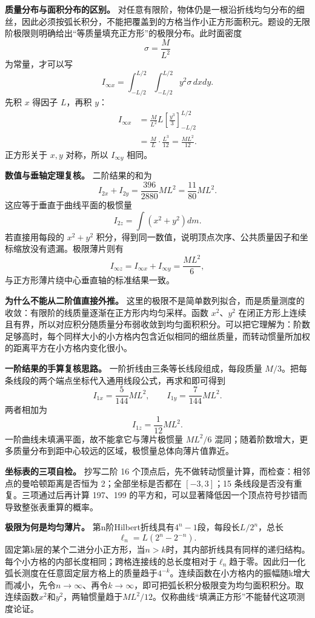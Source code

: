 \documentclass[12pt,a4paper,UTF8]{ctexart}
\begin{document}
\textbf{质量分布与面积分布的区别。}
对任意有限阶，物体仍是一根沿折线均匀分布的细丝，因此必须按弧长积分，不能把覆盖到的方格当作小正方形面积元。题设的无限阶极限则明确给出``等质量填充正方形''的极限分布。此时面密度
\[
\sigma=\frac{M}{L^2}
\] 为常量，才可以写 \[
I_{\infty x}
=\int_{-L/2}^{L/2}\int_{-L/2}^{L/2}y^2\sigma\,dxdy.
\] 先积 \(x\) 得因子 \(L\)，再积 \(y\)： \[
\begin{aligned}
I_{\infty x}
&=\frac{M}{L^2}L
\left[\frac{y^3}{3}\right]_{-L/2}^{L/2}\\
&=\frac{M}{L}\cdot\frac{L^3}{12}
=\frac{ML^2}{12}.
\end{aligned}
\] 正方形关于 \(x,y\) 对称，所以 \(I_{\infty y}\) 相同。

\textbf{数值与垂轴定理复核。} 二阶结果的和为 \[
I_{2x}+I_{2y}
=\frac{396}{2880}ML^2
=\frac{11}{80}ML^2.
\] 这应等于垂直于曲线平面的极惯量 \[
I_{2z}=\int(x^2+y^2)dm.
\] 若直接用每段的 \(x^2+y^2\)
积分，得到同一数值，说明顶点次序、公共质量因子和坐标缩放没有遗漏。极限薄片则有
\[
I_{\infty z}=I_{\infty x}+I_{\infty y}=\frac{ML^2}{6},
\] 与正方形薄片绕中心垂直轴的标准结果一致。

\textbf{为什么不能从二阶值直接外推。}
这里的极限不是简单数列拟合，而是质量测度的收敛：有限阶的线质量逐渐在正方形内均匀采样。函数
\(x^2\)、\(y^2\)
在闭正方形上连续且有界，所以对应积分随质量分布弱收敛到均匀面积积分。可以把它理解为：阶数足够高时，每个同样大小的小方格内包含近似相同的细丝质量，而转动惯量所加权的距离平方在小方格内变化很小。

\textbf{一阶结果的手算复核思路。} 一阶折线由三条等长线段组成，每段质量
\(M/3\)。把每条线段的两个端点坐标代入通用线段公式，再求和即可得到 \[
I_{1x}=\frac5{144}ML^2,\qquad
I_{1y}=\frac7{144}ML^2.
\] 两者相加为 \[
I_{1z}=\frac1{12}ML^2.
\] 一阶曲线未填满平面，故不能拿它与薄片极惯量 \(ML^2/6\)
混同；随着阶数增大，更多质量分布到距中心较远的区域，极惯量总体向薄片值靠近。

\textbf{坐标表的三项自检。} 抄写二阶 16
个顶点后，先不做转动惯量计算，而检查：相邻点的曼哈顿距离是否恒为
2；全部坐标是否都在 \([-3,3]\)；15 条线段是否没有重复。三项通过后再计算
197、199
的平方和，可以显著降低因一个顶点符号抄错而导致整张表重算的概率。

\textbf{极限为何是均匀薄片。}
第n阶Hilbert折线具有\(4^n-1\)段，每段长\(L/2^n\)，总长
\[\ell_n=L(2^n-2^{-n}).\]
固定第k层的某个二进分小正方形，当\(n>k\)时，其内部折线具有同样的递归结构。每个小方格的内部长度相同；跨格连接线的总长度相对于\(\ell_n\)趋于零。因此归一化弧长测度在任意固定层方格上的质量趋于\(4^{-k}\)。连续函数在小方格内的振幅随k增大而减小，先令\(n\to\infty\)、再令\(k\to\infty\)，即可把弧长积分极限变为均匀面积积分。取连续函数\(x^2\)和\(y^2\)，两轴惯量趋于\(ML^2/12\)。仅称曲线``填满正方形''不能替代这项测度论证。
\end{document}
